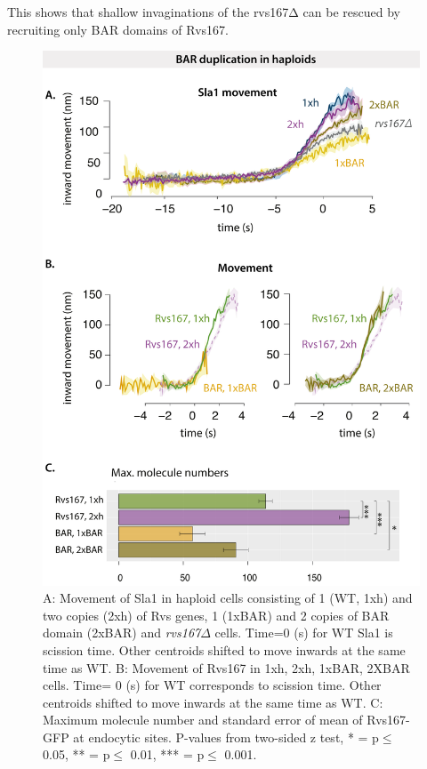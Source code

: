This shows that shallow invaginations of the rvs167Δ can be rescued by recruiting only BAR domains of Rvs167.


		\begin{figure}[H]
		\vspace*{-2 mm}
		\includegraphics[width=21cm,height=21 cm,keepaspectratio]{figures/results_final/scaffolding_overlaid3}
		\caption [Progression of invagination with increasing BAR recruitment]
		{A: Movement of Sla1 in haploid cells consisting of 1 (WT, 1xh) and two copies (2xh) of Rvs genes, 1 (1xBAR) and 2 copies of BAR domain (2xBAR) and  \textit{rvs167$\Delta$} cells. Time=0 (s) for WT Sla1 is scission time. Other centroids shifted to move inwards at the same time as WT.
		B: Movement of Rvs167 in 1xh, 2xh, 1xBAR, 2XBAR cells. Time= 0 (s) for WT corresponds to scission time. Other centroids shifted to move inwards at the same time as WT.
		C: Maximum molecule number and standard error of mean of Rvs167-GFP at endocytic sites. P-values from two-sided z test, * = p$\leq$ 0.05, ** = p$\leq$ 0.01, *** = p$\leq$ 0.001. }
		\label{fig_scaffold}
		\end{figure}


